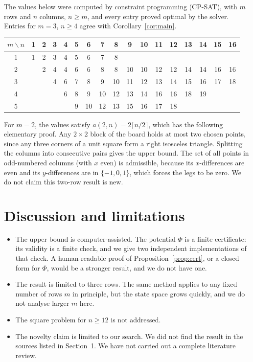 \documentclass[11pt]{article}
\theoremstyle{definition}
\theoremstyle{remark}
\begin{document}
The values below were computed by constraint programming (CP-SAT), with $m$ rows and $n$ columns, $n\ge m$, and every entry proved optimal by the solver. Entries for $m=3$, $n\ge 4$ agree with Corollary~\ref{cor:main}.

{\footnotesize\setlength{\tabcolsep}{2.5pt}
\begin{tabular}{c|cccccccccccccccc}
\toprule
$m\backslash n$ & 1 & 2 & 3 & 4 & 5 & 6 & 7 & 8 & 9 & 10 & 11 & 12 & 13 & 14 & 15 & 16\\
\midrule
1 & 1 & 2 & 3 & 4 & 5 & 6 & 7 & 8 & & & & & & & & \\
2 & & 2 & 4 & 4 & 6 & 6 & 8 & 8 & 10 & 10 & 12 & 12 & 14 & 14 & 16 & 16\\
3 & & & 4 & 6 & 7 & 8 & 9 & 10 & 11 & 12 & 13 & 14 & 15 & 16 & 17 & 18\\
4 & & & & 6 & 8 & 9 & 10 & 12 & 13 & 14 & 16 & 16 & 18 & 19 & & \\
5 & & & & & 9 & 10 & 12 & 13 & 15 & 16 & 17 & 18 & & & & \\
\bottomrule
\end{tabular}}

For $m=2$, the values satisfy $a(2,n)=2\lceil n/2\rceil$, which has the following elementary proof. Any $2\times 2$ block of the board holds at most two chosen points, since any three corners of a unit square form a right isosceles triangle. Splitting the columns into consecutive pairs gives the upper bound. The set of all points in odd-numbered columns (with $x$ even) is admissible, because its $x$-differences are even and its $y$-differences are in $\{-1,0,1\}$, which forces the legs to be zero. We do not claim this two-row result is new.

\section{Discussion and limitations}

\begin{itemize}[leftmargin=*]
\item The upper bound is computer-assisted. The potential $\Phi$ is a finite certificate: its validity is a finite check, and we give two independent implementations of that check. A human-readable proof of Proposition~\ref{prop:cert}, or a closed form for $\Phi$, would be a stronger result, and we do not have one.
\item The result is limited to three rows. The same method applies to any fixed number of rows $m$ in principle, but the state space grows quickly, and we do not analyse larger $m$ here.
\item The square problem for $n\ge 12$ is not addressed.
\item The novelty claim is limited to our search. We did not find the result in the sources listed in Section~1. We have not carried out a complete literature review.
\end{itemize}
\end{document}
